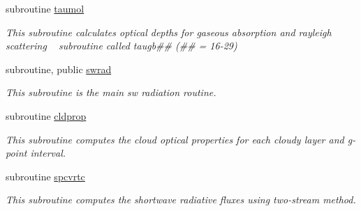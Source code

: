 \begin{DoxyCompactItemize}
subroutine \hyperlink{namespacemodule__radsw__main_afbfb76d4fab10254e065dce350ae5f2b}{taumol}                                                                                               
\begin{DoxyCompactList}\small\item\em This subroutine calculates optical depths for gaseous absorption and rayleigh scattering ~\newline
 subroutine called taugb\#\# (\#\# = 16-\/29) \end{DoxyCompactList}\end{DoxyCompactItemize}
{\bf }\par
\begin{DoxyCompactItemize}
\item 
subroutine, public \hyperlink{namespacemodule__radsw__main_ad9b28f997232642658b4d15a7eb70fcd}{swrad}                                                                                                 
\begin{DoxyCompactList}\small\item\em This subroutine is the main sw radiation routine. \end{DoxyCompactList}\end{DoxyCompactItemize}

{\bf }\par
\begin{DoxyCompactItemize}
\item 
subroutine \hyperlink{namespacemodule__radsw__main_ae9779a4f9bc2ddc9d856c844639c9bd3}{cldprop}                                                                                             
\begin{DoxyCompactList}\small\item\em This subroutine computes the cloud optical properties for each cloudy layer and g-\/point interval. \end{DoxyCompactList}\end{DoxyCompactItemize}

{\bf }\par
\begin{DoxyCompactItemize}
\item 
subroutine \hyperlink{namespacemodule__radsw__main_aa104d257f11aa7e84692c08b3716af66}{spcvrtc}                                                                                             
\begin{DoxyCompactList}\small\item\em This subroutine computes the shortwave radiative fluxes using two-\/stream method. \end{DoxyCompactList}\end{DoxyCompactItemize}

